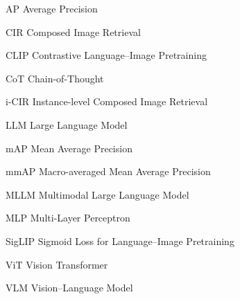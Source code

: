 \begin{abbreviations}
\item[AP] Average Precision
\item[CIR] Composed Image Retrieval
\item[CLIP] Contrastive Language--Image Pretraining
\item[CoT] Chain-of-Thought
\item[i-CIR] Instance-level Composed Image Retrieval
\item[LLM] Large Language Model
\item[mAP] Mean Average Precision
\item[mmAP] Macro-averaged Mean Average Precision
\item[MLLM] Multimodal Large Language Model
\item[MLP] Multi-Layer Perceptron
\item[SigLIP] Sigmoid Loss for Language--Image Pretraining
\item[ViT] Vision Transformer
\item[VLM] Vision--Language Model
\end{abbreviations}
